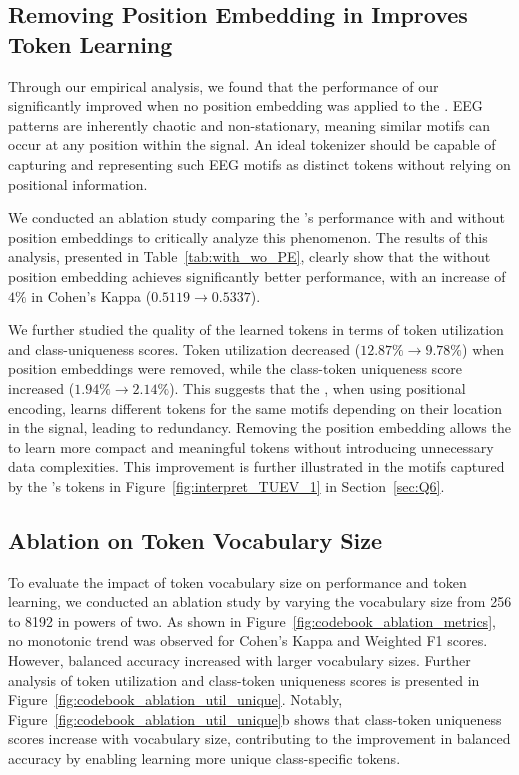 \subsection{Removing Position Embedding in \tokenizer Improves Token Learning}
\label{app:with_wo_pe_ablation}


Through our empirical analysis, we found that the performance of our \method significantly improved when no position embedding was applied to the \tokenizer. EEG patterns are inherently chaotic and non-stationary, meaning similar motifs can occur at any position within the signal. An ideal tokenizer should be capable of capturing and representing such EEG motifs as distinct tokens without relying on positional information. 

We conducted an ablation study comparing the \tokenizer's performance with and without position embeddings to critically analyze this phenomenon. The results of this analysis, presented in Table~\ref{tab:with_wo_PE}, clearly show that the \tokenizer without position embedding achieves significantly better performance, with an increase of $4\%$ in Cohen's Kappa ($0.5119 \rightarrow 0.5337$).

We further studied the quality of the learned tokens in terms of token utilization and class-uniqueness scores. Token utilization decreased ($12.87\% \rightarrow 9.78\%$) when position embeddings were removed, while the class-token uniqueness score increased ($1.94\% \rightarrow 2.14\%$). This suggests that the \tokenizer, when using positional encoding, learns different tokens for the same motifs depending on their location in the signal, leading to redundancy. Removing the position embedding allows the \tokenizer to learn more compact and meaningful tokens without introducing unnecessary data complexities. This improvement is further illustrated in the motifs captured by the \tokenizer's tokens in Figure~\ref{fig:interpret_TUEV_1} in Section~\ref{sec:Q6}.




\subsection{Ablation on Token Vocabulary Size}
To evaluate the impact of token vocabulary size on performance and token learning, we conducted an ablation study by varying the vocabulary size from 256 to 8192 in powers of two. As shown in Figure~\ref{fig:codebook_ablation_metrics}, no monotonic trend was observed for Cohen's Kappa and Weighted F1 scores. However, balanced accuracy increased with larger vocabulary sizes. Further analysis of token utilization and class-token uniqueness scores is presented in Figure~\ref{fig:codebook_ablation_util_unique}. Notably, Figure~\ref{fig:codebook_ablation_util_unique}b shows that class-token uniqueness scores increase with vocabulary size, contributing to the improvement in balanced accuracy by enabling learning more unique class-specific tokens.
 


